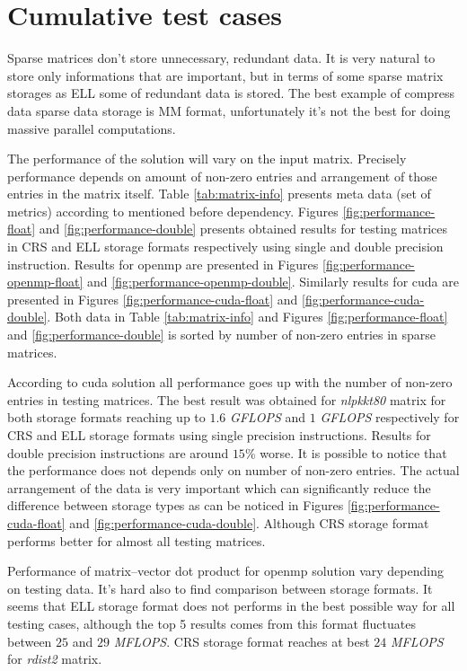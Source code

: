 \chapter{Cumulative test cases}
	Sparse matrices don't store unnecessary, redundant data. It is very natural to store only informations that are important, but in terms of some sparse matrix storages as \gls{ELL} some of redundant data is stored. The best example of compress data sparse data storage is \gls{MM} format, unfortunately it's not the best for doing massive parallel computations.
	
	The performance of the solution will vary on the input matrix. Precisely performance depends on amount of non-zero entries and arrangement of those entries in the matrix itself. Table \ref{tab:matrix-info} presents meta data (set of metrics) according to mentioned before dependency. Figures \ref{fig:performance-float} and \ref{fig:performance-double} presents obtained results for testing matrices in \gls{CRS} and \gls{ELL} storage formats respectively using single and double precision instruction. Results for \gls{openmp} are presented in Figures \ref{fig:performance-openmp-float} and \ref{fig:performance-openmp-double}. Similarly results for \gls{cuda} are presented in Figures \ref{fig:performance-cuda-float} and \ref{fig:performance-cuda-double}. Both data in Table \ref{tab:matrix-info} and Figures \ref{fig:performance-float} and \ref{fig:performance-double} is sorted by number of non-zero entries in sparse matrices.
	
	According to \gls{cuda} solution all performance goes up with the number of non-zero entries in testing matrices. The best result was obtained for \emph{nlpkkt80} matrix for both storage formats reaching up to $1.6$ \emph{G\gls{FLOPS}} and $1$ \emph{G\gls{FLOPS}} respectively for \gls{CRS} and \gls{ELL} storage formats using single precision instructions. Results for double precision instructions are around $15\%$ worse. It is possible to notice that the performance does not depends only on number of non-zero entries. The actual arrangement of the data is very important which can significantly reduce the difference between storage types as can be noticed in Figures \ref{fig:performance-cuda-float} and \ref{fig:performance-cuda-double}. Although \gls{CRS} storage format performs better for almost all testing matrices.
	
	Performance of matrix--vector dot product for \gls{openmp} solution vary depending on testing data. It's hard also to find comparison between storage formats. It seems that \gls{ELL} storage format does not performs in the best possible way for all testing cases, although the top 5 results comes from this format fluctuates between $25$ and $29$ \emph{M\gls{FLOPS}}. \gls{CRS} storage format reaches at best $24$ \emph{M\gls{FLOPS}} for \emph{rdist2} matrix.
	
